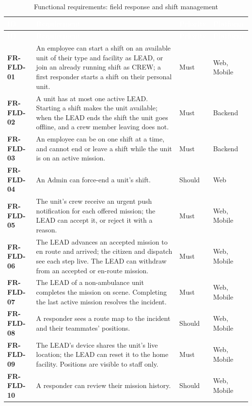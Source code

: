{\tabfont\rowband
\begin{longtable}{@{}>{\raggedright\arraybackslash}p{}>{\raggedright\arraybackslash}p{}>{\raggedright\arraybackslash}p{}>{\raggedright\arraybackslash}p{}@{}}
\caption{Functional requirements: field response and shift management}\label{tab:fr-fld}\\
\rowcolor{najdanavy}\textcolor{white}{\sffamily\bfseries\small ID} & \textcolor{white}{\sffamily\bfseries\small Requirement} & \textcolor{white}{\sffamily\bfseries\small Priority} & \textcolor{white}{\sffamily\bfseries\small Platform}\\
\endfirsthead
\rowcolor{najdanavy}\textcolor{white}{\sffamily\bfseries\small ID} & \textcolor{white}{\sffamily\bfseries\small Requirement} & \textcolor{white}{\sffamily\bfseries\small Priority} & \textcolor{white}{\sffamily\bfseries\small Platform}\\
\endhead
\bottomrule\endlastfoot
\textbf{FR-FLD-01} & An employee can start a shift on an available unit of their type and facility as LEAD, or join an already running shift as CREW; a first responder starts a shift on their personal unit. & Must & Web, Mobile\\
\textbf{FR-FLD-02} & A unit has at most one active LEAD. Starting a shift makes the unit available; when the LEAD ends the shift the unit goes offline, and a crew member leaving does not. & Must & Backend\\
\textbf{FR-FLD-03} & An employee can be on one shift at a time, and cannot end or leave a shift while the unit is on an active mission. & Must & Backend\\
\textbf{FR-FLD-04} & An Admin can force-end a unit’s shift. & Should & Web\\
\textbf{FR-FLD-05} & The unit’s crew receive an urgent push notification for each offered mission; the LEAD can accept it, or reject it with a reason. & Must & Web, Mobile\\
\textbf{FR-FLD-06} & The LEAD advances an accepted mission to en route and arrived; the citizen and dispatch see each step live. The LEAD can withdraw from an accepted or en-route mission. & Must & Web, Mobile\\
\textbf{FR-FLD-07} & The LEAD of a non-ambulance unit completes the mission on scene. Completing the last active mission resolves the incident. & Must & Web, Mobile\\
\textbf{FR-FLD-08} & A responder sees a route map to the incident and their teammates’ positions. & Should & Web, Mobile\\
\textbf{FR-FLD-09} & The LEAD’s device shares the unit’s live location; the LEAD can reset it to the home facility. Positions are visible to staff only. & Must & Web, Mobile\\
\textbf{FR-FLD-10} & A responder can review their mission history. & Should & Web, Mobile\\
\end{longtable}}
